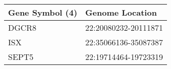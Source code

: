 \begin{tabular}{ll}
\toprule
Gene Symbol (4) &      Genome Location \\
\midrule
          DGCR8 & 22:20080232-20111871 \\
            ISX & 22:35066136-35087387 \\
          SEPT5 & 22:19714464-19723319 \\
\bottomrule
\end{tabular}
